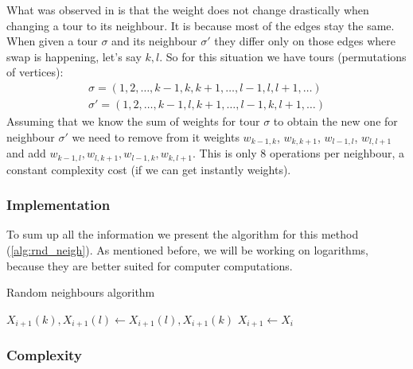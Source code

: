 		What was observed in \cite{decryption_tsp_MCMC} is that the weight does not change drastically when changing a tour to its neighbour. It is because most of the edges stay the same. When given a tour $\sigma$ and its neighbour $\sigma'$ they differ only on those edges where swap is happening, let's say $k,l$. So for this situation we have tours (permutations of vertices):
		\begin{align*}
			\sigma = (1, 2, \ldots, k-1, k, k+1, \ldots, l-1, l, l+1, \ldots) \\
			\sigma' = (1, 2, \ldots, k-1, l, k+1, \ldots, l-1, k, l+1, \ldots)
		\end{align*}
		Assuming that we know the sum of weights for tour $\sigma$ to obtain the new one for neighbour $\sigma'$ we need to remove from it weights $w_{k-1, k}$, $w_{k, k+1}$, $w_{l-1, l}$, $w_{l, l+1}$ and add $w_{k-1, l}, w_{l, k+1}, w_{l-1, k}, w_{k, l+1}$. This is only $8$ operations per neighbour, a constant complexity cost (if we can get instantly weights).
		
	\subsubsection{Implementation}
		To sum up all the information we present the algorithm for this method (\ref{alg:rnd_neigh}). As mentioned before, we will be working on logarithms, because they are better suited for computer computations.
		
		\begin{algorithm}
			\caption{Random neighbours algorithm}\label{alg:rnd_neigh}
			\begin{algorithmic}[1]
				
				\State $X_{i+1}(k), X_{i+1}(l) \gets X_{i+1}(l), X_{i+1}(k)$
				\Else
				\State $X_{i+1} \gets X_i$
				\EndIf
				\EndFor
			\end{algorithmic}
		\end{algorithm}
	
	\subsubsection{Complexity}

